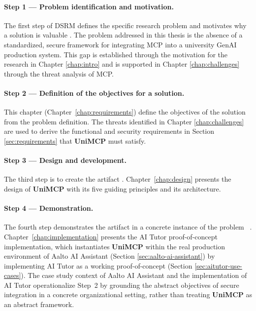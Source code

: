 \documentclass[english, 12pt, a4paper, elec, utf8, a-2b, online]{aaltothesis}
\newcommand{\UniMCP}{\textbf{UniMCP}\xspace}
\newcommand{\aaltoai}{\text{Aalto AI Assistant}\xspace}
\begin{document}
\paragraph{Step 1 --- Problem identification and motivation.}
The first step of DSRM defines the specific research problem and motivates why a solution is valuable \cite{peffers2007design}.
The problem addressed in this thesis is the absence of a standardized, secure framework for integrating MCP into a university GenAI production system. 
This gap is established through the motivation for the research in Chapter \ref{chap:intro} and is supported in Chapter \ref{chap:challenges} through the threat analysis of MCP.

\paragraph{Step 2 --- Definition of the objectives for a solution.}
This chapter (Chapter~\ref{chap:requirements}) define the objectives of the solution from the problem definition.
The threats identified in Chapter \ref{chap:challenges} are used to derive the functional and security requirements in Section \ref{sec:requirements} that \UniMCP must satisfy.

\paragraph{Step 3 --- Design and development.}
The third step is to create the artifact \cite{peffers2007design}.
Chapter~\ref{chap:design} presents the design of \UniMCP with its five guiding principles and its architecture.

\paragraph{Step 4 --- Demonstration.}
The fourth step demonstrates the artifact in a concrete instance of the problem ~\cite{peffers2007design}.
Chapter~\ref{chap:implementation} presents the AI Tutor proof-of-concept implementation, which instantiates \UniMCP within the real production environment of Aalto AI Assistant (Section \ref{sec:aalto-ai-assistant}) by implementing AI Tutor as a working proof-of-concept  (Section \ref{sec:aitutor-use-cases}). 
The case study context of Aalto AI Assistant and the implementation of AI Tutor operationalize Step~2 by grounding the abstract objectives of secure integration in a concrete organizational setting, rather than treating \UniMCP as an abstract framework.
\end{document}
